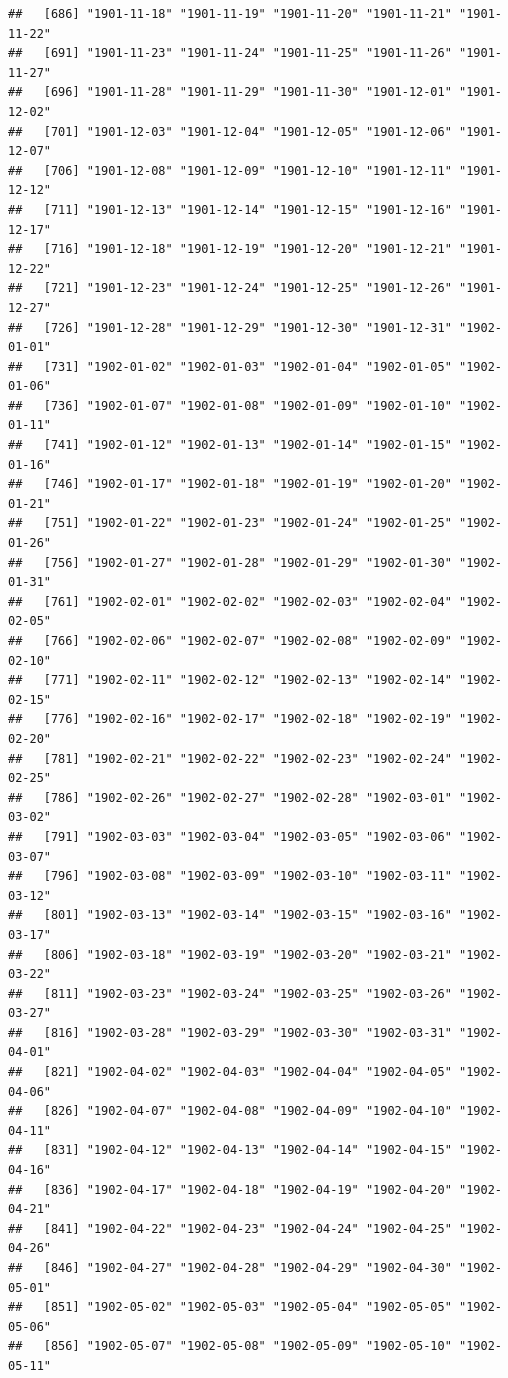 \documentclass{article}\usepackage[]{graphicx}\usepackage[]{color}
\makeatletter
\newenvironment{kframe}{%
 \def\at@end@of@kframe{}%
 \ifinner\ifhmode%
  \def\at@end@of@kframe{\end{minipage}}%
  \begin{minipage}{\columnwidth}%
 \fi\fi%
 \def\FrameCommand##1{\hskip\@totalleftmargin \hskip-\fboxsep
 \colorbox{shadecolor}{##1}\hskip-\fboxsep
     \hskip-\linewidth \hskip-\@totalleftmargin \hskip\columnwidth}%
 \MakeFramed {\advance\hsize-\width
   \@totalleftmargin\z@ \linewidth\hsize
   \@setminipage}}%
 {\par\unskip\endMakeFramed%
 \at@end@of@kframe}
\newenvironment{knitrout}{}{} %
\makeatother
\begin{document}
\begin{description}
\begin{knitrout}
\begin{kframe}
\begin{verbatim}
##   [686] "1901-11-18" "1901-11-19" "1901-11-20" "1901-11-21" "1901-11-22"
##   [691] "1901-11-23" "1901-11-24" "1901-11-25" "1901-11-26" "1901-11-27"
##   [696] "1901-11-28" "1901-11-29" "1901-11-30" "1901-12-01" "1901-12-02"
##   [701] "1901-12-03" "1901-12-04" "1901-12-05" "1901-12-06" "1901-12-07"
##   [706] "1901-12-08" "1901-12-09" "1901-12-10" "1901-12-11" "1901-12-12"
##   [711] "1901-12-13" "1901-12-14" "1901-12-15" "1901-12-16" "1901-12-17"
##   [716] "1901-12-18" "1901-12-19" "1901-12-20" "1901-12-21" "1901-12-22"
##   [721] "1901-12-23" "1901-12-24" "1901-12-25" "1901-12-26" "1901-12-27"
##   [726] "1901-12-28" "1901-12-29" "1901-12-30" "1901-12-31" "1902-01-01"
##   [731] "1902-01-02" "1902-01-03" "1902-01-04" "1902-01-05" "1902-01-06"
##   [736] "1902-01-07" "1902-01-08" "1902-01-09" "1902-01-10" "1902-01-11"
##   [741] "1902-01-12" "1902-01-13" "1902-01-14" "1902-01-15" "1902-01-16"
##   [746] "1902-01-17" "1902-01-18" "1902-01-19" "1902-01-20" "1902-01-21"
##   [751] "1902-01-22" "1902-01-23" "1902-01-24" "1902-01-25" "1902-01-26"
##   [756] "1902-01-27" "1902-01-28" "1902-01-29" "1902-01-30" "1902-01-31"
##   [761] "1902-02-01" "1902-02-02" "1902-02-03" "1902-02-04" "1902-02-05"
##   [766] "1902-02-06" "1902-02-07" "1902-02-08" "1902-02-09" "1902-02-10"
##   [771] "1902-02-11" "1902-02-12" "1902-02-13" "1902-02-14" "1902-02-15"
##   [776] "1902-02-16" "1902-02-17" "1902-02-18" "1902-02-19" "1902-02-20"
##   [781] "1902-02-21" "1902-02-22" "1902-02-23" "1902-02-24" "1902-02-25"
##   [786] "1902-02-26" "1902-02-27" "1902-02-28" "1902-03-01" "1902-03-02"
##   [791] "1902-03-03" "1902-03-04" "1902-03-05" "1902-03-06" "1902-03-07"
##   [796] "1902-03-08" "1902-03-09" "1902-03-10" "1902-03-11" "1902-03-12"
##   [801] "1902-03-13" "1902-03-14" "1902-03-15" "1902-03-16" "1902-03-17"
##   [806] "1902-03-18" "1902-03-19" "1902-03-20" "1902-03-21" "1902-03-22"
##   [811] "1902-03-23" "1902-03-24" "1902-03-25" "1902-03-26" "1902-03-27"
##   [816] "1902-03-28" "1902-03-29" "1902-03-30" "1902-03-31" "1902-04-01"
##   [821] "1902-04-02" "1902-04-03" "1902-04-04" "1902-04-05" "1902-04-06"
##   [826] "1902-04-07" "1902-04-08" "1902-04-09" "1902-04-10" "1902-04-11"
##   [831] "1902-04-12" "1902-04-13" "1902-04-14" "1902-04-15" "1902-04-16"
##   [836] "1902-04-17" "1902-04-18" "1902-04-19" "1902-04-20" "1902-04-21"
##   [841] "1902-04-22" "1902-04-23" "1902-04-24" "1902-04-25" "1902-04-26"
##   [846] "1902-04-27" "1902-04-28" "1902-04-29" "1902-04-30" "1902-05-01"
##   [851] "1902-05-02" "1902-05-03" "1902-05-04" "1902-05-05" "1902-05-06"
##   [856] "1902-05-07" "1902-05-08" "1902-05-09" "1902-05-10" "1902-05-11"

\end{verbatim}
\end{kframe}
\end{knitrout}
\end{description}
\end{document}
